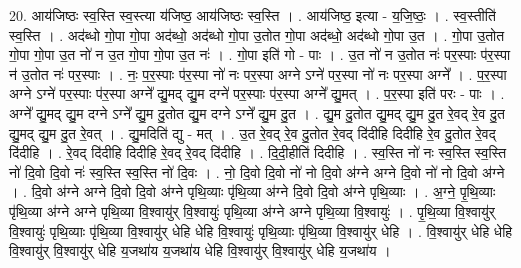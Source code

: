 \documentclass[17pt]{extarticle}
\begin{document}
20. आय॑जिष्ठः स्व॒स्ति स्व॒स्त्या य॑जिष्ठ॒ आय॑जिष्ठः स्व॒स्ति । . आय॑जिष्ठ॒ इत्या - य॒जि॒ष्ठः॒ । . स्व॒स्तीति॑ स्व॒स्ति । . अद॑ब्धो गो॒पा गो॒पा अद॑ब्धो॒ अद॑ब्धो गो॒पा उ॒तोत गो॒पा अद॑ब्धो॒ अद॑ब्धो गो॒पा उ॒त । . गो॒पा उ॒तोत गो॒पा गो॒पा उ॒त नो॑ न उ॒त गो॒पा गो॒पा उ॒त नः॑ । . गो॒पा इति॑ गो - पाः । . उ॒त नो॑ न उ॒तोत नः॑ पर॒स्पाः प॑र॒स्पा न॑ उ॒तोत नः॑ पर॒स्पाः । . नः॒ प॒र॒स्पाः प॑र॒स्पा नो॑ नः पर॒स्पा अग्ने ऽग्ने॑ पर॒स्पा नो॑ नः पर॒स्पा अग्ने᳚ । . प॒र॒स्पा अग्ने ऽग्ने॑ पर॒स्पाः प॑र॒स्पा अग्ने᳚ द्यु॒मद् द्यु॒म दग्ने॑ पर॒स्पाः प॑र॒स्पा अग्ने᳚ द्यु॒मत् । . प॒र॒स्पा इति॑ परः - पाः । . अग्ने᳚ द्यु॒मद् द्यु॒म दग्ने ऽग्ने᳚ द्यु॒म दु॒तोत द्यु॒म दग्ने ऽग्ने᳚ द्यु॒म दु॒त । . द्यु॒म दु॒तोत द्यु॒मद् द्यु॒म दु॒त रे॒वद् रे॒व दु॒त द्यु॒मद् द्यु॒म दु॒त रे॒वत् । . द्यु॒मदिति॑ द्यु - मत् । . उ॒त रे॒वद् रे॒व दु॒तोत रे॒वद् दि॑दीहि दिदीहि रे॒व दु॒तोत रे॒वद् दि॑दीहि । . रे॒वद् दि॑दीहि दिदीहि रे॒वद् रे॒वद् दि॑दीहि । . दि॒दी॒हीति॑ दिदीहि । . स्व॒स्ति नो॑ नः स्व॒स्ति स्व॒स्ति नो॑ दि॒वो दि॒वो नः॑ स्व॒स्ति स्व॒स्ति नो॑ दि॒वः । . नो॒ दि॒वो दि॒वो नो॑ नो दि॒वो अ॑ग्ने अग्ने दि॒वो नो॑ नो दि॒वो अ॑ग्ने । . दि॒वो अ॑ग्ने अग्ने दि॒वो दि॒वो अ॑ग्ने पृथि॒व्याः पृ॑थि॒व्या अ॑ग्ने दि॒वो दि॒वो अ॑ग्ने पृथि॒व्याः । . अ॒ग्ने॒ पृ॒थि॒व्याः पृ॑थि॒व्या अ॑ग्ने अग्ने पृथि॒व्या वि॒श्वायु॑र् वि॒श्वायुः॑ पृथि॒व्या अ॑ग्ने अग्ने पृथि॒व्या वि॒श्वायुः॑ । . पृ॒थि॒व्या वि॒श्वायु॑र् वि॒श्वायुः॑ पृथि॒व्याः पृ॑थि॒व्या वि॒श्वायु॑र् धेहि धेहि वि॒श्वायुः॑ पृथि॒व्याः पृ॑थि॒व्या वि॒श्वायु॑र् धेहि । . वि॒श्वायु॑र् धेहि धेहि वि॒श्वायु॑र् वि॒श्वायु॑र् धेहि य॒जथा॑य य॒जथा॑य धेहि वि॒श्वायु॑र् वि॒श्वायु॑र् धेहि य॒जथा॑य । \newline
\end{document}

